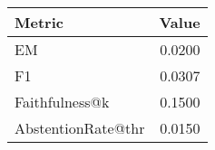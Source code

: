 \begin{tabular}{l r}
\hline
Metric & Value \\ \hline
EM & 0.0200 \\ 
F1 & 0.0307 \\ 
Faithfulness@k & 0.1500 \\ 
AbstentionRate@thr & 0.0150 \\ \hline
\end{tabular}
